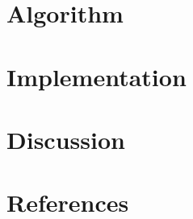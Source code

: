 \documentclass[fleqn,11pt]{SelfArx} %
\begin{document}
\section{Algorithm}
\section{Implementation}
\section{Discussion}
\section{References}

\thispagestyle{empty} %


\FloatBarrier



\end{document}

